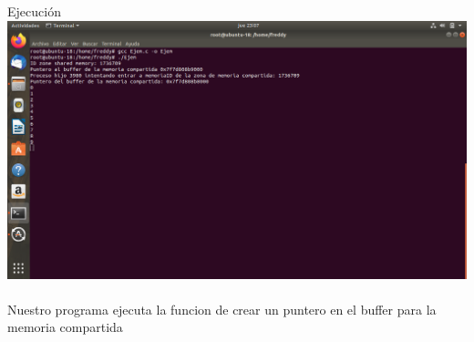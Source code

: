 \documentclass[11pt,a4paper]{report}
\begin{document}
\clearpage
Ejecuci\'on\\
\includegraphics[scale=.35]{Ejem.png}
\\
\\
Nuestro programa ejecuta la funcion de crear un puntero en el buffer para la memoria compartida
\clearpage
\end{document}
